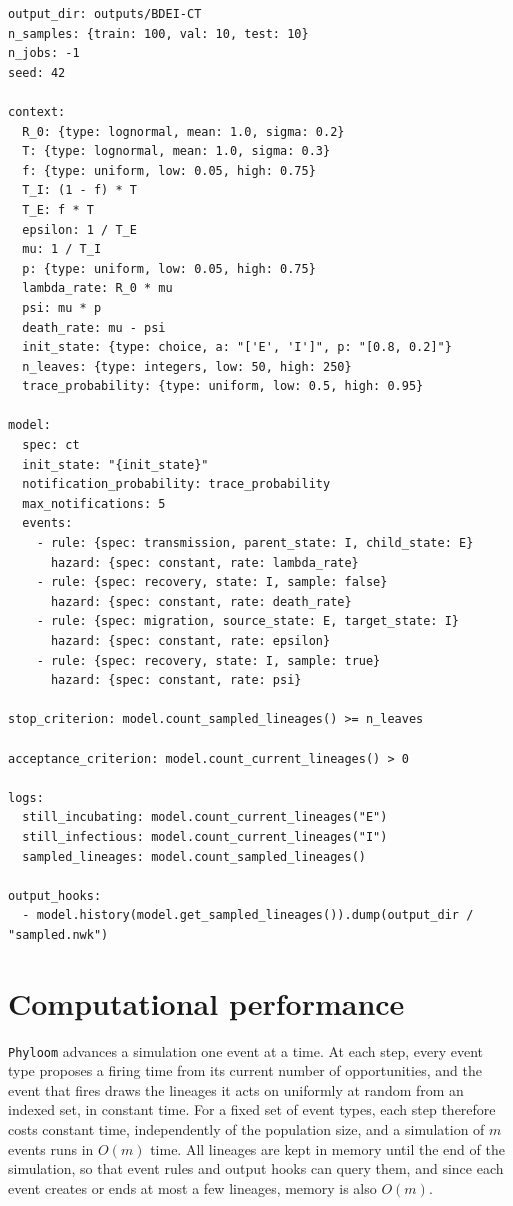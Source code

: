 \documentclass[11pt]{article}
\begin{document}
\begin{lstlisting}[style=cfg]
output_dir: outputs/BDEI-CT
n_samples: {train: 100, val: 10, test: 10}
n_jobs: -1
seed: 42

context:
  R_0: {type: lognormal, mean: 1.0, sigma: 0.2}
  T: {type: lognormal, mean: 1.0, sigma: 0.3}
  f: {type: uniform, low: 0.05, high: 0.75}
  T_I: (1 - f) * T
  T_E: f * T
  epsilon: 1 / T_E
  mu: 1 / T_I
  p: {type: uniform, low: 0.05, high: 0.75}
  lambda_rate: R_0 * mu
  psi: mu * p
  death_rate: mu - psi
  init_state: {type: choice, a: "['E', 'I']", p: "[0.8, 0.2]"}
  n_leaves: {type: integers, low: 50, high: 250}
  trace_probability: {type: uniform, low: 0.5, high: 0.95}

model:
  spec: ct
  init_state: "{init_state}"
  notification_probability: trace_probability
  max_notifications: 5
  events:
    - rule: {spec: transmission, parent_state: I, child_state: E}
      hazard: {spec: constant, rate: lambda_rate}
    - rule: {spec: recovery, state: I, sample: false}
      hazard: {spec: constant, rate: death_rate}
    - rule: {spec: migration, source_state: E, target_state: I}
      hazard: {spec: constant, rate: epsilon}
    - rule: {spec: recovery, state: I, sample: true}
      hazard: {spec: constant, rate: psi}

stop_criterion: model.count_sampled_lineages() >= n_leaves

acceptance_criterion: model.count_current_lineages() > 0

logs:
  still_incubating: model.count_current_lineages("E")
  still_infectious: model.count_current_lineages("I")
  sampled_lineages: model.count_sampled_lineages()

output_hooks:
  - model.history(model.get_sampled_lineages()).dump(output_dir / "sampled.nwk")
\end{lstlisting}

\section{Computational performance}
\label{sec:performance}

\texttt{Phyloom} advances a simulation one event at a time. At each step,
every event type proposes a firing time from its current number of
opportunities, and the event that fires draws the lineages it acts on
uniformly at random from an indexed set, in constant time. For a fixed set of
event types, each step therefore costs constant time, independently of the
population size, and a simulation of $m$ events runs in $O(m)$ time. All
lineages are kept in memory until the end of the simulation, so that event
rules and output hooks can query them, and since each event creates or ends at
most a few lineages, memory is also $O(m)$.
\end{document}
